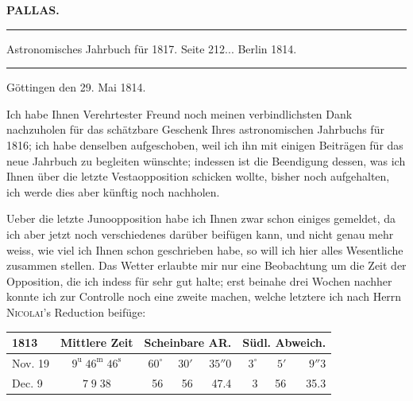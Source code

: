 \clearpage{}
\begin{center}\textbf{PALLAS.}\par\vspace{4pt}\hrule\vspace{4pt}\fontsize{10}{12}\selectfont Astronomisches Jahrbuch für 1817. Seite 212\;... Berlin 1814.\par\vspace{4pt}\hrule\vspace{4pt}\end{center}

\begin{flushright}
Göttingen den 29. Mai 1814.
\end{flushright}

\par\indent Ich habe Ihnen Verehrtester Freund noch meinen verbindlichsten Dank nachzuholen für das schätzbare Geschenk Ihres astronomischen Jahrbuchs für 1816; ich habe denselben aufgeschoben, weil ich ihn mit einigen Beiträgen für das neue Jahrbuch zu begleiten wünschte; indessen ist die Beendigung dessen, was ich Ihnen über die letzte Vestaopposition schicken wollte, bisher noch aufgehalten, ich werde dies aber künftig noch nachholen.

\par\indent Ueber die letzte Junoopposition habe ich Ihnen zwar schon einiges gemeldet, da ich aber jetzt noch verschiedenes darüber beifügen kann, und nicht genau mehr weiss, wie viel ich Ihnen schon geschrieben habe, so will ich hier alles Wesentliche zusammen stellen. Das Wetter erlaubte mir nur eine Beobachtung um die Zeit der Opposition, die ich indess für sehr gut halte; erst beinahe drei Wochen nachher konnte ich zur Controlle noch eine zweite machen, welche letztere ich nach Herrn \textsc{Nicolai}'s Reduction beifüge:

\begin{center}\fontsize{10}{12}\selectfont\setlength{\tabcolsep}{3pt}\renewcommand{\arraystretch}{1.15}\begin{tabular}{l|c|rrr|rrr}
1813 & Mittlere Zeit & \multicolumn{3}{c|}{Scheinbare AR.} & \multicolumn{3}{c}{Südl. Abweich.}\\\hline
Nov. 19 & $9^{\mathrm u}\;46^{\mathrm m}\;46^{\mathrm s}$ & $60^\circ$ & $30'$ & $35''0$ & $3^\circ$ & $5'$ & $9''3$\\
Dec. 9 & $7\;9\;38$ & 56 & 56 & 47.4 & 3 & 56 & 35.3\\
\end{tabular}\end{center}

